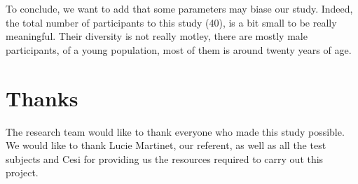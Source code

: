 \documentclass[12pt, openany, twocolumn]{article}
\begin{document}
    To conclude, we want to add that some parameters may biase our study. Indeed, the total number of participants to this study (40), is a bit small to be really meaningful. 
    Their diversity is not really motley, there are mostly male participants, of a young population, most of them is around twenty years of age. 

\section{Thanks}

The research team would like to thank everyone who made this study possible. We would like to thank Lucie Martinet, our referent, as well as all the test subjects and Cesi for providing us the resources required to carry out this project.



\end{document}
